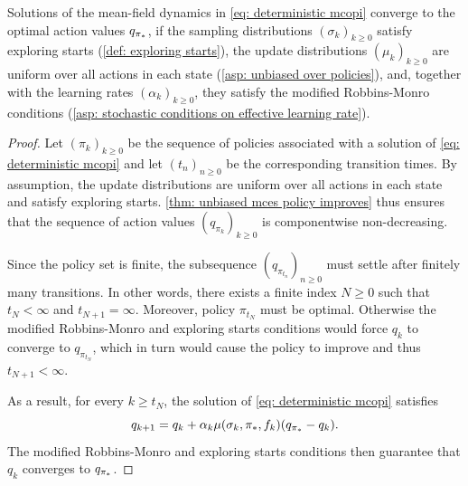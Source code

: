 \begin{proposition}
\label{thm: convergence deterministic mcopi}
    Solutions of the mean-field dynamics in \eqref{eq: deterministic mcopi} converge to the optimal action values $q_{{\pi}_*}$,
    if the 
    sampling distributions $(\sigma_k)_{k \ge 0}$ satisfy exploring starts (\autoref{def: exploring starts}),
    the update distributions $(\mu_k)_{k \ge 0}$ are uniform over all actions in each state (\autoref{asp: unbiased over policies}),
    and, together with the learning rates $(\alpha_k)_{k \ge 0}$, they satisfy the modified Robbins-Monro conditions (\autoref{asp: stochastic conditions on effective learning rate}).
\end{proposition}
\vspace{-0.8cm}
\begin{proof}
Let $(\pi_k)_{k \ge 0}$ be the sequence of policies associated with a solution of \eqref{eq: deterministic mcopi}
and let $(t_n)_{n \ge 0}$ be the corresponding transition times.
By assumption, the update distributions are uniform over all actions in each state and satisfy exploring starts.
\autoref{thm: unbiased mces policy improves} thus ensures that the sequence of action values $(q_{\pi_k})_{k \ge 0}$ is componentwise non-decreasing.

Since the policy set is finite, the subsequence $(q_{\pi_{t_n}})_{n \ge 0}$ must settle after finitely many transitions.
In other words, there exists a finite index \(N \ge 0\) such that
$t_N < \infty$ and $t_{N+1} = \infty$.
Moreover, policy $\pi_{t_N}$ must be optimal. Otherwise the modified Robbins-Monro and exploring starts conditions would force $q_k$ to converge to $q_{\pi_{t_N}}$, which in turn would cause the policy to improve and thus $t_{N+1}<\infty$.


As a result, for every $k \ge t_N$, the solution of \eqref{eq: deterministic mcopi} satisfies
\[
q_{k+1} = q_k + \alpha_k \mu(\sigma_k, {\pi}_*, f_k)( q_{{\pi}_*} - q_k) .
\]
The modified Robbins-Monro and exploring starts conditions then guarantee that $q_k$ converges to $q_{{\pi}_*}$.
\end{proof}



